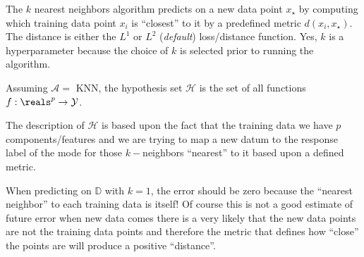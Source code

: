 \documentclass[12pt]{article}
\begin{document}
\begin{enumerate}


\begin{tcolorbox}[colback=white, sharp corners]

The $k$ nearest neighbors algorithm predicts on a new data point $x_\star$ by computing which training data point $x_i$ is ``closest'' to it by a predefined metric $d(x_i, x_\star)$. The distance is either the $L^1$ or $L^2$ (\emph{default}) loss/distance function. Yes, $k$ is a hyperparameter because the choice of $k$ is selected prior to running the algorithm. 

\end{tcolorbox}


\begin{tcolorbox}[colback=white, sharp corners]

Assuming $\mathcal{A} = $ KNN, the hypothesis set $\mathcal{H}$ is the set of all functions $f : \reals^p \to \mathcal{Y}$. 

The description of $\mathcal{H}$ is based upon the fact that the training data we have $p$ components/features and we are trying to map a new datum to the response label of the mode for those $k-$neighbors ``nearest'' to it based upon a defined metric. 


\end{tcolorbox}


\begin{tcolorbox}[colback=white, sharp corners]

When predicting on $\mathbb{D}$ with $k=1$, the error should be zero because the ``nearest neighbor'' to each training data is itself! Of course this is not a good estimate of future error when new data comes there is a very likely that the new data points are not the training data points and therefore the metric that defines how ``close'' the points are will produce a positive ``distance''. 

\end{tcolorbox}

\end{enumerate}
\end{document}

